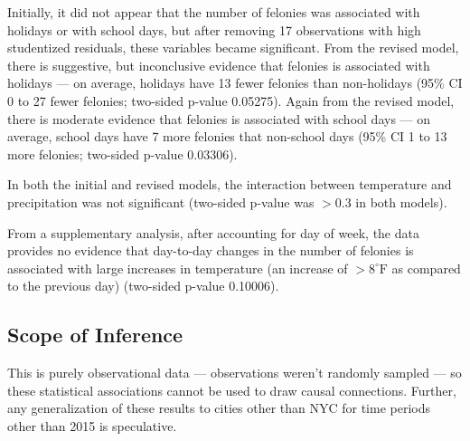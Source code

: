 \documentclass[11pt,notitlepage]{article}
\newcommand{\degf}{^\circ\text{F}}
\begin{document}
Initially, it did not appear that the number of felonies was associated with holidays or with school days, but after removing 17 observations with high studentized residuals, these variables became significant. From the revised model, there is suggestive, but inconclusive evidence that felonies is associated with holidays --- on average, holidays have 13 fewer felonies than non-holidays (95\% CI 0 to 27 fewer felonies; two-sided p-value 0.05275). Again from the revised model, there is moderate evidence that felonies is associated with school days --- on average, school days have 7 more felonies that non-school days (95\% CI 1 to 13 more felonies; two-sided p-value 0.03306).

In both the initial and revised models, the interaction between temperature and precipitation was not significant (two-sided p-value was $>0.3$ in both models).


From a supplementary analysis, after accounting for day of week, the data provides no evidence that day-to-day changes in the number of felonies is associated with large increases in temperature (an increase of $>8 \degf$ as compared to the previous day) (two-sided p-value 0.10006).


\subsection{Scope of Inference}

This is purely observational data --- observations weren't randomly sampled --- so these statistical associations cannot be used to draw causal connections. Further, any generalization of these results to cities other than NYC for time periods other than 2015 is speculative.



\listoftodos

\pagebreak

%
%
\end{document}
